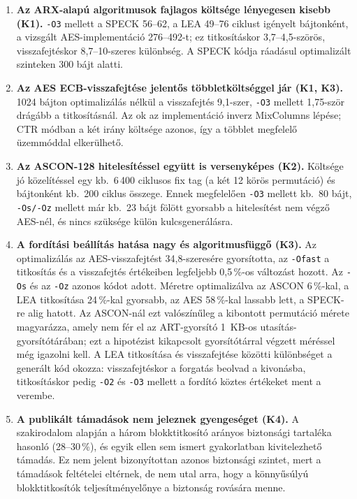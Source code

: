 \documentclass[a4paper,12pt]{report}
\theoremstyle{definition}
\theoremstyle{remark}
\begin{document}
\begin{enumerate}
\item \textbf{Az ARX-alapú algoritmusok fajlagos költsége lényegesen kisebb (K1).} \texttt{-O3} mellett a SPECK 56--62, a LEA 49--76 ciklust igényelt bájtonként, a vizsgált AES-implementáció 276--492-t; ez titkosításkor 3,7--4,5-szörös, visszafejtéskor 8,7--10-szeres különbség. A SPECK kódja ráadásul optimalizált szinteken 300 bájt alatti.

\item \textbf{Az AES ECB-visszafejtése jelentős többletköltséggel jár (K1, K3).} 1024 bájton optimalizálás nélkül a visszafejtés 9,1-szer, \texttt{-O3} mellett 1,75-ször drágább a titkosításnál. Az ok az implementáció inverz MixColumns lépése; CTR módban a két irány költsége azonos, így a többlet megfelelő üzemmóddal elkerülhető.

\item \textbf{Az ASCON-128 hitelesítéssel együtt is versenyképes (K2).} Költsége jó közelítéssel egy kb.\ 6\,400 ciklusos fix tag (a két 12 körös permutáció) és bájtonként kb.\ 200 ciklus összege. Ennek megfelelően \texttt{-O3} mellett kb.\ 80 bájt, \texttt{-Os/-Oz} mellett már kb.\ 23 bájt fölött gyorsabb a hitelesítést nem végző AES-nél, és nincs szüksége külön kulcsgenerálásra.

\item \textbf{A fordítási beállítás hatása nagy és algoritmusfüggő (K3).} Az optimalizálás az AES-visszafejtést 34,8-szeresére gyorsította, az \texttt{-Ofast} a titkosítás és a visszafejtés értékeiben legfeljebb 0,5\,\%-os változást hozott. Az \texttt{-Os} és az \texttt{-Oz} azonos kódot adott. Méretre optimalizálva az ASCON 6\,\%-kal, a LEA titkosítása 24\,\%-kal gyorsabb, az AES 58\,\%-kal lassabb lett, a SPECK-re alig hatott. Az ASCON-nál ezt valószínűleg a kibontott permutáció mérete magyarázza, amely nem fér el az ART-gyorsító 1~KB-os utasítás-gyorsítótárában; ezt a hipotézist kikapcsolt gyorsítótárral végzett méréssel még igazolni kell. A LEA titkosítása és visszafejtése közötti különbséget a generált kód okozza: visszafejtéskor a forgatás beolvad a kivonásba, titkosításkor pedig \texttt{-O2} és \texttt{-O3} mellett a fordító köztes értékeket ment a verembe.

\item \textbf{A publikált támadások nem jeleznek gyengeséget (K4).} A szakirodalom alapján a három blokktitkosító arányos biztonsági tartaléka hasonló (28--30\,\%), és egyik ellen sem ismert gyakorlatban kivitelezhető támadás. Ez nem jelent bizonyítottan azonos biztonsági szintet, mert a támadások feltételei eltérnek, de nem utal arra, hogy a könnyűsúlyú blokktitkosítók teljesítményelőnye a biztonság rovására menne.
\end{enumerate}
\end{document}

